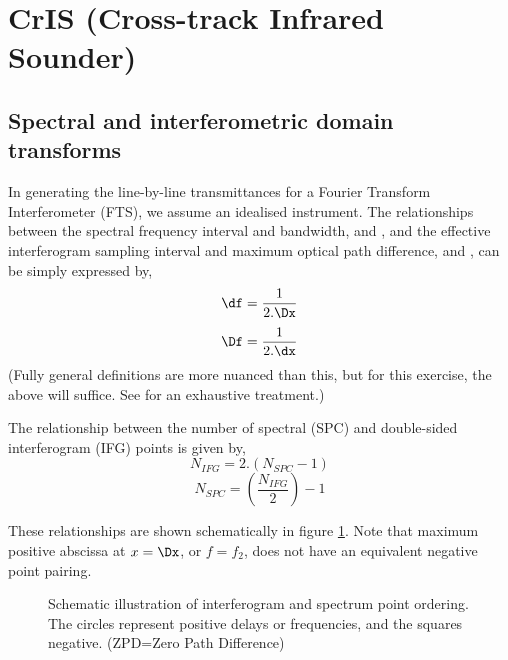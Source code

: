 \section{CrIS (Cross-track Infrared Sounder)}

\subsection{Spectral and interferometric domain transforms}
In generating the line-by-line transmittances for a Fourier Transform Interferometer (FTS), we assume an idealised instrument. The relationships between the spectral frequency interval and bandwidth, {\df} and {\Df}, and the effective interferogram sampling interval and maximum optical path difference, {\dx} and {\Dx}, can be simply expressed by,
\begin{equation}\df = \frac{1}{2.\Dx}\label{eqn:df_deltax}\end{equation}
\begin{equation}\Df = \frac{1}{2.\dx}\label{eqn:deltaf_dx}\end{equation}
(Fully general definitions are more nuanced than this, but for this exercise, the above will suffice. See \citet{Bell_1972} for an exhaustive treatment.)

The relationship between the number of spectral (SPC) and double-sided interferogram (IFG) points is given by,
\begin{equation}N_{IFG} = 2.(N_{SPC}-1)\end{equation}
\begin{equation}N_{SPC} = \left(\frac{N_{IFG}}{2}\right) - 1\end{equation}

These relationships are shown schematically in figure \ref{fig:X_F_defn}. Note that maximum positive abscissa at $x = \Dx$, or $f = f_{2}$, does not have an equivalent negative point pairing.
\begin{figure}[htp]
  \centering
  
  \caption{Schematic illustration of interferogram and spectrum point ordering. The circles represent positive delays or frequencies, and the squares negative. (ZPD=Zero Path Difference)}
  \label{fig:X_F_defn}
\end{figure}

